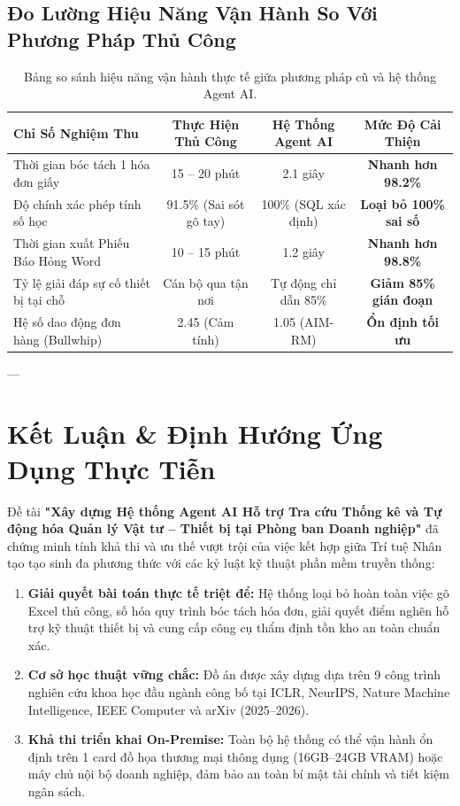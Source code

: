 \documentclass[11pt,a4paper]{article}
\begin{document}
\subsection{Đo Lường Hiệu Năng Vận Hành So Với Phương Pháp Thủ Công}
\begin{table}[H]
\centering
\small
\begin{tabularx}{\linewidth}{>{\raggedright\arraybackslash}Xccc}
\toprule
\textbf{Chỉ Số Nghiệm Thu} & \textbf{Thực Hiện Thủ Công} & \textbf{Hệ Thống Agent AI} & \textbf{Mức Độ Cải Thiện} \\
\midrule
Thời gian bóc tách 1 hóa đơn giấy & 15 -- 20 phút & 2.1 giây & \textbf{Nhanh hơn 98.2\%} \\
Độ chính xác phép tính số học & 91.5\% (Sai sót gõ tay) & 100\% (SQL xác định) & \textbf{Loại bỏ 100\% sai số} \\
Thời gian xuất Phiếu Báo Hỏng Word & 10 -- 15 phút & 1.2 giây & \textbf{Nhanh hơn 98.8\%} \\
Tỷ lệ giải đáp sự cố thiết bị tại chỗ & Cán bộ qua tận nơi & Tự động chỉ dẫn 85\% & \textbf{Giảm 85\% gián đoạn} \\
Hệ số dao động đơn hàng (Bullwhip) & 2.45 (Cảm tính) & 1.05 (AIM-RM) & \textbf{Ổn định tối ưu} \\
\bottomrule
\end{tabularx}
\caption{Bảng so sánh hiệu năng vận hành thực tế giữa phương pháp cũ và hệ thống Agent AI.}
\end{table}

---

\section{Kết Luận \& Định Hướng Ứng Dụng Thực Tiễn}

Đề tài \textbf{"Xây dựng Hệ thống Agent AI Hỗ trợ Tra cứu Thống kê và Tự động hóa Quản lý Vật tư -- Thiết bị tại Phòng ban Doanh nghiệp"} đã chứng minh tính khả thi và ưu thế vượt trội của việc kết hợp giữa Trí tuệ Nhân tạo tạo sinh đa phương thức với các kỷ luật kỹ thuật phần mềm truyền thống:

\begin{enumerate}[leftmargin=1.8em]
    \item \textbf{Giải quyết bài toán thực tế triệt để:} Hệ thống loại bỏ hoàn toàn việc gõ Excel thủ công, số hóa quy trình bóc tách hóa đơn, giải quyết điểm nghẽn hỗ trợ kỹ thuật thiết bị và cung cấp công cụ thẩm định tồn kho an toàn chuẩn xác.
    \item \textbf{Cơ sở học thuật vững chắc:} Đồ án được xây dựng dựa trên 9 công trình nghiên cứu khoa học đầu ngành công bố tại ICLR, NeurIPS, Nature Machine Intelligence, IEEE Computer và arXiv (2025--2026).
    \item \textbf{Khả thi triển khai On-Premise:} Toàn bộ hệ thống có thể vận hành ổn định trên 1 card đồ họa thương mại thông dụng (16GB--24GB VRAM) hoặc máy chủ nội bộ doanh nghiệp, đảm bảo an toàn bí mật tài chính và tiết kiệm ngân sách.
\end{enumerate}
\end{document}
